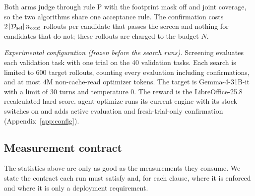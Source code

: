 Both \capevolve{} arms judge through rule P with the footprint mask off and joint coverage, so the two algorithms share one
acceptance rule. The confirmation costs $2\,|\mathcal{D}_{\mathrm{sel}}|\,n_{\mathrm{conf}}$ rollouts per candidate that passes the screen and
nothing for candidates that do not; these rollouts are charged to the budget $N$.

\emph{Experimental configuration (frozen before the search runs).}
Screening evaluates each validation task with one trial on the 40 validation tasks. Each search is limited to
$600$ target rollouts, counting every evaluation including confirmations, and at most $4\mathrm{M}$ non-cache-read
optimizer tokens. The target is Gemma-4-31B-it with a limit of $30$ turns and temperature $0$. The reward is the
LibreOffice-25.8 recalculated hard score. agent-optimize runs its current engine with its stock switches on and adds active evaluation and fresh-trial-only confirmation (Appendix~\ref{app:config}).

\subsection{Measurement contract}
\label{sec:method:contract}

The statistics above are only as good as the measurements they consume. We state the contract each run must satisfy and,
for each clause, where it is enforced and where it is only a deployment requirement.

